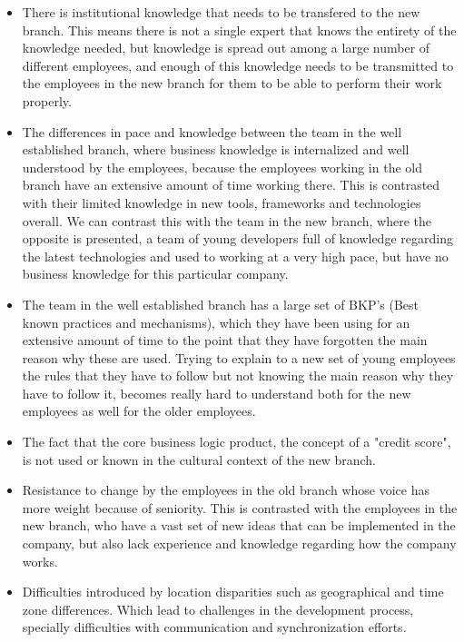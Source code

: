 \documentclass[12pt, letterpaper]{article}
\begin{document}
\begin{itemize}
  \item There is institutional knowledge that needs to be transfered to the new branch. This means there is not a single expert that 
  knows the entirety of the knowledge needed, but knowledge is spread out among a 
large number of different employees, and enough of this knowledge needs to be transmitted to the employees in the new 
branch for them to be able to perform their work properly.
  \item The differences in pace and knowledge between the team in the well established branch, where  
  business knowledge is internalized and well understood by the employees, because the employees working in the old branch have an extensive amount of time working there. This is contrasted with their limited knowledge in new tools, 
  frameworks and technologies overall. We can contrast this with the team in the new branch, where the opposite is
  presented, a team of young developers full of knowledge regarding the latest technologies and used to working at a 
  very high pace, but have no business knowledge for this particular company. 
  \item The team in the well established branch has a large set of BKP's (Best known practices and mechanisms), 
  which they have been using for an extensive amount of time to the point that they have forgotten the main reason
  why these are used. Trying to explain to a new set of young employees the rules that they have to follow but not
  knowing the main reason why they have to follow it, becomes really hard to understand both for the new employees
  as well for the older employees.
  \item The fact that the core business logic product, the concept of a "credit score", is not used or known in the 
cultural context of the new branch.
  \item Resistance to change by the employees in the old branch whose voice has more weight
  because of seniority. This is contrasted with the employees in the new branch, who have a vast set of new ideas 
  that can be implemented in the company, but also lack experience and knowledge regarding how the company works.
  \item Difficulties introduced by location disparities such as geographical and time zone differences. Which lead to 
  challenges in the development process, specially difficulties with communication and synchronization efforts.
\end{itemize}
\end{document}
